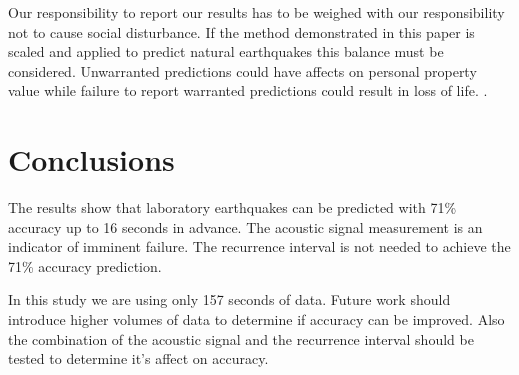 \documentclass[]{llncs} %
\begin{document}
Our responsibility to report our results has to be weighed with our responsibility not to cause social disturbance. If the method demonstrated in this paper is scaled and applied to predict natural earthquakes this balance must be considered. Unwarranted predictions could have affects on personal property value while failure to report warranted predictions could result in loss of life. \cite{Ayhan}. \par

\section{Conclusions}

The results show that laboratory earthquakes can be predicted with 71\% accuracy up to 16 seconds in advance. The acoustic signal measurement is an indicator of imminent failure. The recurrence interval is not needed to achieve the 71\% accuracy prediction. \par

In this study we are using only 157 seconds of data. Future work should introduce higher volumes of data to determine if accuracy can be improved. Also the combination of the acoustic signal and the recurrence interval should be tested to determine it's affect on accuracy. 
\par



\end{document}
